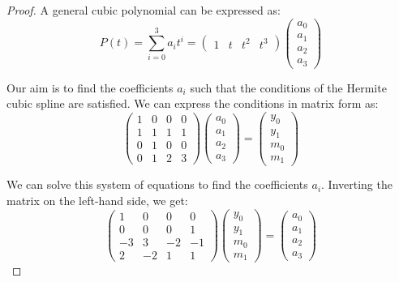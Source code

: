 \begin{proof}
    A general cubic polynomial can be expressed as:
    \[P(t) = \sum_{i=0}^{3} a_i t^i
    = \begin{pmatrix}
        1 & t & t^2 & t^3
    \end{pmatrix}
    \begin{pmatrix}
        a_0 \\ a_1 \\ a_2 \\ a_3
    \end{pmatrix}\]

    Our aim is to find the coefficients $a_i$ such that the conditions of the Hermite cubic spline are satisfied. We can express the conditions in matrix form as:
    \[\begin{pmatrix}
    1 & 0 & 0 & 0 \\
    1 & 1 & 1 & 1 \\
    0 & 1 & 0 & 0 \\
    0 & 1 & 2 & 3
    \end{pmatrix}
    \begin{pmatrix}
        a_0 \\ a_1 \\ a_2 \\ a_3
    \end{pmatrix} =
    \begin{pmatrix}
        y_0 \\ y_1 \\ m_0 \\ m_1
    \end{pmatrix}\]

    We can solve this system of equations to find the coefficients $a_i$. Inverting the matrix on the left-hand side, we get:
    \[\begin{pmatrix}
    1 & 0 & 0 & 0 \\
    0 & 0 & 0 & 1 \\
    -3 & 3 & -2 & -1 \\
    2 & -2 & 1 & 1
    \end{pmatrix}
    \begin{pmatrix}
        y_0 \\ y_1 \\ m_0 \\ m_1
    \end{pmatrix} =
    \begin{pmatrix}
        a_0 \\ a_1 \\ a_2 \\ a_3
    \end{pmatrix}\]


\end{proof}
